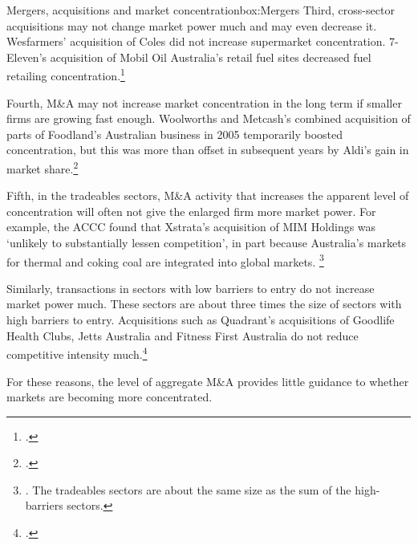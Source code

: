 \begin{bigbox}{Mergers, acquisitions and market concentration}{box:Mergers}
Third, cross-sector acquisitions may not change market power much and may even decrease it. Wesfarmers' acquisition of Coles did not increase supermarket concentration. 7-Eleven's acquisition of Mobil Oil Australia's retail fuel sites decreased fuel retailing concentration.\footcite{7eleven_divestment}

Fourth, M\&A may not increase market concentration in the long term if smaller firms are growing fast enough. Woolworths and Metcash's combined acquisition of parts of Foodland's Australian business in 2005 temporarily boosted concentration, but this was more than offset in subsequent years by Aldi's gain in market share.\footcite{FT_Foodland_2005}

Fifth, in the tradeables sectors, M\&A activity that increases the apparent level of concentration will often not give the enlarged firm more market power. For example, the ACCC found that Xstrata's acquisition of MIM Holdings was `unlikely to substantially lessen competition', in part because Australia's markets for thermal and coking coal are integrated into global markets.%
  \footnote{\textcite{ACCC_Xstrata}. The tradeables sectors are about the same size as the sum of the high-barriers sectors.}

Similarly, transactions in sectors with low barriers to entry do not increase market power much. These sectors are about three times the size of sectors with high barriers to entry. Acquisitions such as Quadrant's acquisitions of Goodlife Health Clubs, Jetts Australia and Fitness First Australia do not reduce competitive intensity much.\footcite{ACCC_Fitness}

For these reasons, the level of aggregate M\&A provides little guidance to whether markets are becoming more concentrated.




\end{bigbox}
